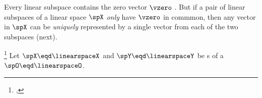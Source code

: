 Every linear subspace contains the zero vector $\vzero$ .
But if a pair of linear subspaces of a linear space $\spX$ \emph{only} have $\vzero$ in commmon, then
any vector in $\spX$ can be \emph{uniquely} represented by a single vector from each of the two subspaces (next).
\begin{theorem}
\footnote{
  ,
  }
\label{thm:XY0_unique}
Let $\spX\eqd\linearspaceX$ and $\spY\eqd\linearspaceY$ be s 
of a   $\spO\eqd\linearspaceO$.
\end{theorem}
